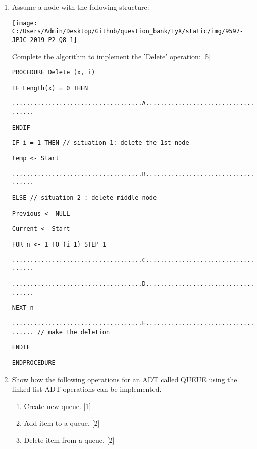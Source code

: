 \begin{enumerate}
\item Assume a node with the following structure: 
\begin{center}
\texttt{[image: C:/Users/Admin/Desktop/Github/question\_bank/LyX/static/img/9597-JPJC-2019-P2-Q8-1]}
\par\end{center}

Complete the algorithm to implement the 'Delete' operation: \hfill{}{[}5{]}

\noindent %
\noindent\begin{minipage}[t]{1\columnwidth}%
\texttt{PROCEDURE Delete (x, i) }

\texttt{\qquad{}IF Length(x) = 0 THEN }

\texttt{\qquad{}\qquad{}....................................A.................................... }

\texttt{\qquad{}ENDIF }

\texttt{\qquad{}IF i = 1 THEN // situation 1: delete the 1st node }

\texttt{\qquad{}\qquad{}temp <- Start }

\texttt{\qquad{}\qquad{}....................................B.................................... }

\texttt{\qquad{}ELSE // situation 2 : delete middle node }

\texttt{\qquad{}\qquad{}Previous <- NULL }

\texttt{\qquad{}\qquad{}Current <- Start }

\texttt{\qquad{}\qquad{}FOR n <- 1 TO (i \textendash{} 1) STEP 1 }

\texttt{\qquad{}\qquad{}\qquad{}....................................C.................................... }

\texttt{\qquad{}\qquad{}\qquad{}....................................D.................................... }

\texttt{\qquad{}\qquad{}NEXT n }

\texttt{\qquad{}\qquad{}\qquad{}....................................E.................................... //
make the deletion }

\texttt{\qquad{}ENDIF }

\texttt{ENDPROCEDURE }%
\end{minipage}
\item Show how the following operations for an ADT called QUEUE using the
linked list ADT operations can be implemented. 
\begin{enumerate}
\item Create new queue. \hfill{}{[}1{]}
\item Add item to a queue. \hfill{}{[}2{]}
\item Delete item from a queue. \hfill{} {[}2{]}
\end{enumerate}
\end{enumerate}